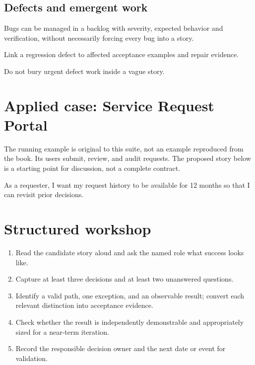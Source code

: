 \documentclass[11pt,letterpaper]{article}
\begin{document}
\subsection{Defects and emergent work}
Bugs can be managed in a backlog with severity, expected behavior and verification, without necessarily forcing every bug into a story.

\begin{tcolorbox}[colback=tealback,colframe=navy,title={Engineering translation},breakable]
Link a regression defect to affected acceptance examples and repair evidence.

\end{tcolorbox}
\begin{tcolorbox}[colback=amberback,colframe=navy,title={Failure mode to watch},breakable]
Do not bury urgent defect work inside a vague story.

\end{tcolorbox}
\section{Applied case: Service Request Portal}
The running example is original to this suite, not an example reproduced from the book. Its users submit, review, and audit requests. The proposed story below is a starting point for discussion, not a complete contract.

\begin{tcolorbox}[colback=blueback,colframe=navy,title={Candidate story},breakable]
As a requester, I want my request history to be available for 12 months so that I can revisit prior decisions.

\end{tcolorbox}
\section{Structured workshop}
\begin{enumerate}[leftmargin=*,itemsep=3pt]
\item Read the candidate story aloud and ask the named role what success looks like.
\item Capture at least three decisions and at least two unanswered questions.
\item Identify a valid path, one exception, and an observable result; convert each relevant distinction into acceptance evidence.
\item Check whether the result is independently demonstrable and appropriately sized for a near-term iteration.
\item Record the responsible decision owner and the next date or event for validation.
\end{enumerate}
\end{document}
